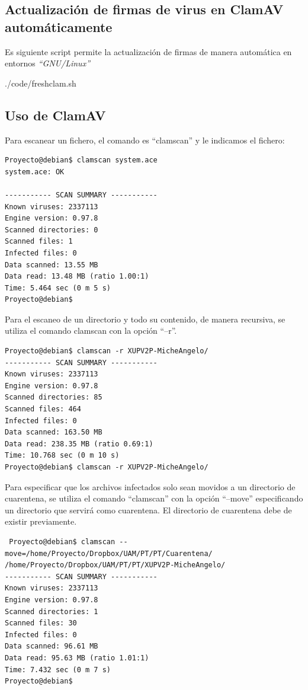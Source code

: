 \subsection{Actualizaci\'on de firmas de virus en  ClamAV automáticamente}

Es siguiente script permite la actualizaci\'on de firmas de  manera automática 
en entornos \emph{``GNU/Linux''}



{./code/freshclam.sh}



\subsection{Uso de ClamAV}

Para escanear un fichero, el comando es ``clamscan'' y le indicamos el fichero:

\begin{verbatim}
Proyecto@debian$ clamscan system.ace 
system.ace: OK

----------- SCAN SUMMARY -----------
Known viruses: 2337113
Engine version: 0.97.8
Scanned directories: 0
Scanned files: 1
Infected files: 0
Data scanned: 13.55 MB
Data read: 13.48 MB (ratio 1.00:1)
Time: 5.464 sec (0 m 5 s)
Proyecto@debian$
\end{verbatim}

Para el escaneo de un directorio y todo su contenido, de manera recursiva, se 
utiliza el comando clamscan con la opción ``--r''.

\begin{verbatim}
Proyecto@debian$ clamscan -r XUPV2P-MicheAngelo/
----------- SCAN SUMMARY -----------
Known viruses: 2337113
Engine version: 0.97.8
Scanned directories: 85
Scanned files: 464
Infected files: 0
Data scanned: 163.50 MB
Data read: 238.35 MB (ratio 0.69:1)
Time: 10.768 sec (0 m 10 s)
Proyecto@debian$ clamscan -r XUPV2P-MicheAngelo/

\end{verbatim}

Para especificar que los archivos infectados solo sean movidos a un directorio 
de cuarentena, se utiliza el comando ``clamscan'' con la opción ``--move'' 
especificando un directorio que servirá como cuarentena. El directorio de 
cuarentena debe de existir previamente.

\begin{verbatim}
 Proyecto@debian$ clamscan --move=/home/Proyecto/Dropbox/UAM/PT/PT/Cuarentena/ 
/home/Proyecto/Dropbox/UAM/PT/PT/XUPV2P-MicheAngelo/
----------- SCAN SUMMARY -----------
Known viruses: 2337113
Engine version: 0.97.8
Scanned directories: 1
Scanned files: 30
Infected files: 0
Data scanned: 96.61 MB
Data read: 95.63 MB (ratio 1.01:1)
Time: 7.432 sec (0 m 7 s)
Proyecto@debian$ 
\end{verbatim}


